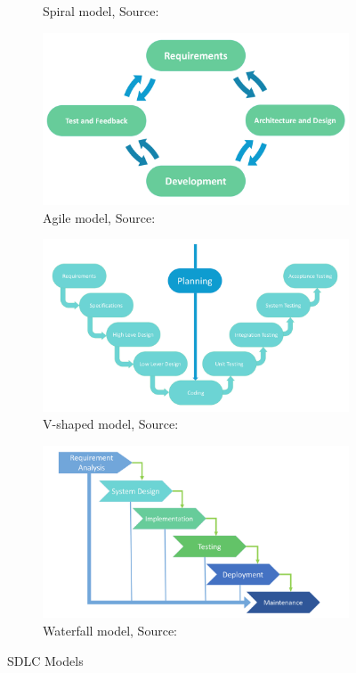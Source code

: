 \begin{figure}[htbp]
\begin{subfigure}[b]{0.45\textwidth}
		\caption{Spiral model, Source: \citet{Team:2017}}
		\label{fig: 4}
	\end{subfigure}
	\hfill
	\begin{subfigure}[b]{0.45\textwidth}
		\centering
		\includegraphics[width=\textwidth]{./Agile}
		\caption{Agile model, Source: \citet{Team:2017}}
		\label{fig: 5}
	\end{subfigure}
	\hfill
	\begin{subfigure}[b]{0.45\textwidth}
		\centering
		\includegraphics[width=\textwidth]{./V-Shaped}
		\caption{V-shaped model, Source: \citet{Team:2017}}
		\label{fig: 6}
	\end{subfigure}
	\hfill
	\begin{subfigure}[b]{0.5\textwidth}
		\centering
		\includegraphics[width=\textwidth]{./waterfall}
		\caption{Waterfall model, Source: \citet{Team:2017}}
		\label{fig: 7}
	\end{subfigure}
\caption{\ac{SDLC} Models}
\end{figure}
